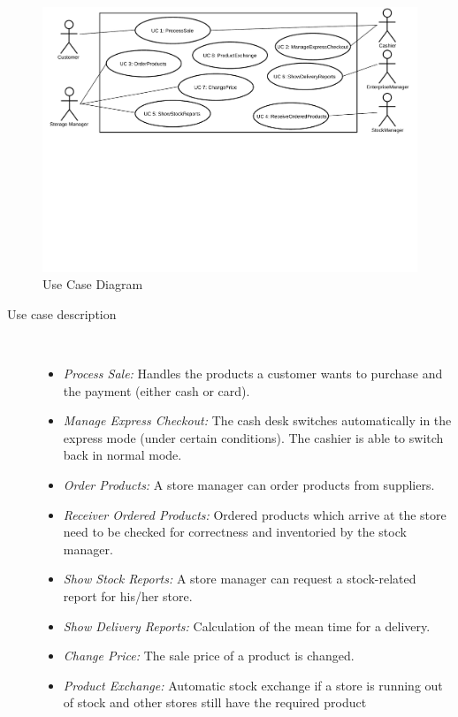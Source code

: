\begin{figure}[h!]
	\includegraphics[width=\textwidth, trim={0 11cm 0 0}]{img/useCase.pdf}
	\caption{Use Case Diagram}
	\label{fig:useCases}
\end{figure}


\begin{description}


 \item[Use case description]~\par
\begin{itemize}
	\item \textit{Process Sale:} Handles the products a customer wants to purchase and the payment (either cash or card).

    \item \textit{Manage Express Checkout:} The cash desk switches automatically in the express mode (under certain conditions). The cashier is able to switch back in normal mode.
    \item \textit{Order Products:} A store manager can order products from suppliers.
    \item \textit{Receiver Ordered Products:} Ordered products which arrive at the store need to be checked for correctness and inventoried by the stock manager.
    \item \textit{Show Stock Reports:} A store manager can request a stock-related report for his/her store.
    \item \textit{Show Delivery Reports:} Calculation of the mean time for a delivery.
    \item \textit{Change Price:} The sale price of a product is changed.
    \item \textit{Product Exchange:} Automatic stock exchange if a store is running out of stock and other stores still have the required product
\end{itemize}


\end{description}